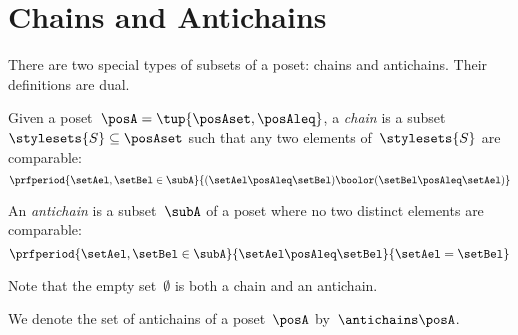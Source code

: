 
\section{Chains and Antichains}
\label{sec:chains-antichains}

There are two special types of subsets of a poset: chains and antichains.
Their definitions are dual.

\begin{definition}
	\label{def:chain}
	Given a poset~$\posA = \tup{\posAset, \posAleq}$, a \emph{chain} is a subset~$\stylesets{S} \subseteq \posAset$ such that any two elements of~$\stylesets{S}$ are comparable:
	\begin{equation}
		\prfperiod{
			\setAel,\setBel \in \subA
		}{
			(\setAel \posAleq  \setBel) \boolor (\setBel \posAleq  \setAel)
		}
	\end{equation}
\end{definition}

\begin{definition}
	\label{def:antichain}
	An \emph{antichain} is a subset~$\subA$ of a poset where no two distinct elements are comparable:
	\begin{equation}
		\prfperiod{
			\setAel,\setBel \in \subA
		}{
			\setAel \posAleq \setBel
		}{
			\setAel = \setBel
		}
	\end{equation}
\end{definition}
\begin{remark}
	Note that the empty set~$\emptyset$ is both a chain and an antichain.
\end{remark}

We denote the set of antichains of a poset~$\posA$ by~$\antichains\posA$.

